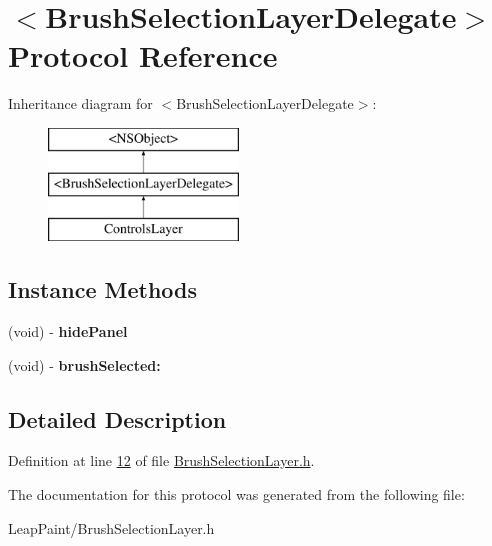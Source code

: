 \hypertarget{protocol_brush_selection_layer_delegate-p}{\section{$<$Brush\-Selection\-Layer\-Delegate$>$ Protocol Reference}
\label{d7/dd2/protocol_brush_selection_layer_delegate-p}
}
Inheritance diagram for $<$Brush\-Selection\-Layer\-Delegate$>$\-:\begin{figure}[H]
\begin{center}
\leavevmode
\includegraphics[height=3.000000cm]{d7/dd2/protocol_brush_selection_layer_delegate-p}
\end{center}
\end{figure}
\subsection*{Instance Methods}
\begin{DoxyCompactItemize}
\item 
\hypertarget{protocol_brush_selection_layer_delegate-p_a22d681b5b588c7524638b37e1331057e}{(void) -\/ {\bfseries hide\-Panel}}\label{d7/dd2/protocol_brush_selection_layer_delegate-p_a22d681b5b588c7524638b37e1331057e}

\item 
\hypertarget{protocol_brush_selection_layer_delegate-p_ad5ad967fe1efe627f46296129703f8f8}{(void) -\/ {\bfseries brush\-Selected\-:}}\label{d7/dd2/protocol_brush_selection_layer_delegate-p_ad5ad967fe1efe627f46296129703f8f8}

\end{DoxyCompactItemize}


\subsection{Detailed Description}


Definition at line \hyperlink{_brush_selection_layer_8h_source_l00012}{12} of file \hyperlink{_brush_selection_layer_8h_source}{Brush\-Selection\-Layer.\-h}.



The documentation for this protocol was generated from the following file\-:\begin{DoxyCompactItemize}
\item 
Leap\-Paint/Brush\-Selection\-Layer.\-h\end{DoxyCompactItemize}
